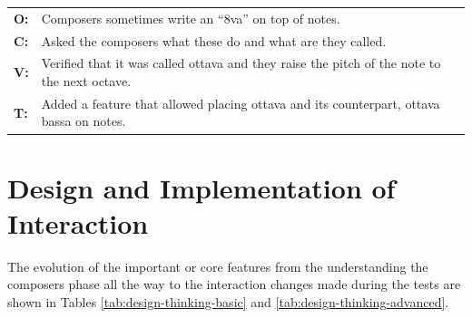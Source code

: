 \begin{table} [H]
\begin{tabular}{|p{.5cm} p{13.5cm}|}
			  	\textbf{O:} 	& Composers sometimes write an ``8va'' on top of notes. \\
			  	\textbf{C:} 	& Asked the composers what these do and what are they called. \\
			  	\textbf{V:} 	& Verified that it was called ottava and they raise the pitch of the note to the next octave. \\
			  	\textbf{T:} 	& Added a feature that allowed placing ottava and its counterpart, ottava bassa on notes. \\
			  	\hline
			\end{tabular}
		\end{table}

	\section{Design and Implementation of Interaction}
	\label{sec:design}

		The evolution of the important or core features from the understanding the composers phase all the way to the interaction changes made during the tests are shown in Tables \ref{tab:design-thinking-basic} and \ref{tab:design-thinking-advanced}.

